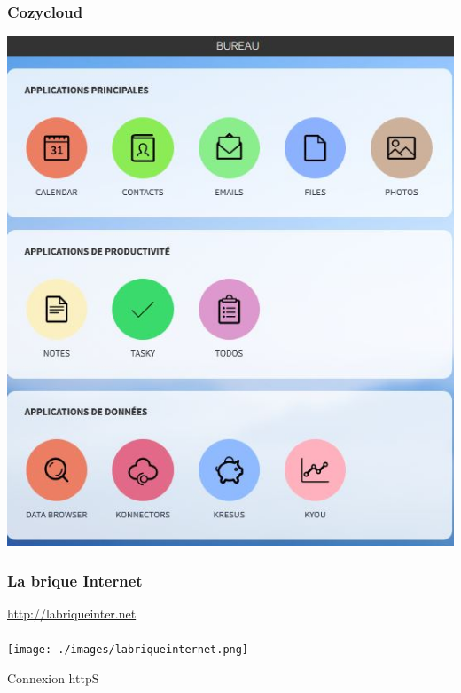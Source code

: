 \documentclass{beamer}
\begin{document}
\begin{frame}
\begin{center}
\frametitle{Cozycloud}
\includegraphics[scale=0.6] {./images/Cozycloud.jpg}
\end{center}
\end{frame}
\begin{frame}
\begin{center}
\frametitle{La brique Internet}
\url{http://labriqueinter.net}
\\~\\
\texttt{[image: ./images/labriqueinternet.png]}
\end{center}
\end{frame}

\begin{frame}
\begin{center}
\Huge{Connexion httpS}
\end{center}
\end{frame}
\end{document}
